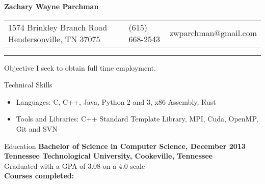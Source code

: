 \documentclass[10pt]{res}
\begin{document}
 



\fontsize{10}{11}\selectfont

\begin{resume}

\vspace{-15mm}
\begin{center}
\begin{Huge}
    \bf{Zachary Wayne Parchman}
\end{Huge}
\end{center}
\vspace{-4mm}


\begin{large}
\begin{tabularx}{\textwidth}{p{2.10in} X X}
    1574 Brinkley Branch Road \newline Hendersonville, TN 37075
    & (615) 668-2543 & zwparchman@gmail.com\\
\end{tabularx}
\end{large}

\vspace{-0.30in}
\rule{\textwidth}{0.4pt}

\begin{section}{Objective}
    I seek to obtain full time employment.
\end{section}

\begin{section}{Technical Skills}
\begin{itemize}[leftmargin=*] \itemsep -2pt  %
    \item {Languages: C, C++, Java, Python 2 and 3, x86 Assembly, Rust}
    \item {Tools and Libraries: C++ Standard Template Library, MPI, Cuda, OpenMP, Git and SVN}
\end{itemize}
\end{section}

\begin{section}{Education}
    {\bf Bachelor of Science in Computer Science, December 2013\\
    Tennessee Technological University, Cookeville, Tennessee}\\
    Graduated with a GPA of 3.08 on a 4.0 scale\\
    {\bf Courses completed:}


\end{section}
\end{resume}
\end{document}
